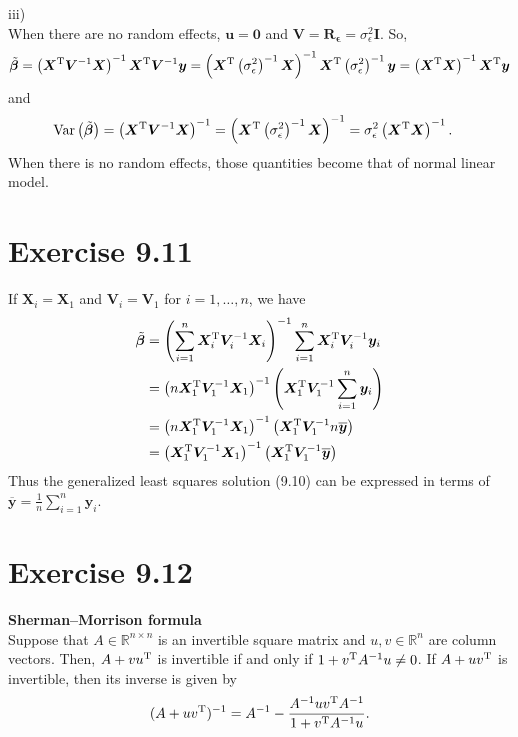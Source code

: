 \documentclass[a4paper]{article}
\newcommand{\Var}{\mathrm{Var}}
\begin{document}
iii)\\
When there are no random effects, $\bm{u} = \bm{0}$ and $\bm{V} = \bm{R}_{\bm{\epsilon}} = \sigma_{\epsilon}^{2}\bm{I}$.
So,
\begin{align*}
\tilde{\bm{\beta}} = \left(\bm{X}^{\rm T}\bm{V}^{-1}\bm{X}\right)^{-1}\bm{X}^{\rm T}\bm{V}^{-1}\bm{y} = \left(\bm{X}^{\rm T}\left(\sigma_{\epsilon}^{2}\right)^{-1}\bm{X}\right)^{-1}\bm{X}^{\rm T}\left(\sigma_{\epsilon}^{2}\right)^{-1}\bm{y} = \left(\bm{X}^{\rm T}\bm{X}\right)^{-1}\bm{X}^{\rm T}\bm{y} 
\end{align*}
and
\begin{align*}
\Var\left(\tilde{\bm{\beta}}\right) &= \left(\bm{X}^{\rm T}\bm{V}^{-1}\bm{X}\right)^{-1} = \left(\bm{X}^{\rm T}\left(\sigma_{\epsilon}^{2}\right)^{-1}\bm{X}\right)^{-1} = \sigma_{\epsilon}^{2}\left(\bm{X}^{\rm T}\bm{X}\right)^{-1}.
\end{align*}
When there is no random effects, those quantities become that of normal linear model.



\vspace{\baselineskip}
\section{Exercise 9.11}
If $\bm{X}_{i}=\bm{X}_{1}$ and $\bm{V}_{i}=\bm{V}_{1}$ for $i=1,\ldots ,n$, we have
\begin{align*}
\tilde{\bm{\beta}} &= \left(\sum_{i=1}^{n}\bm{X}_{i}^{\rm T}\bm{V}_{i}^{-1}\bm{X}_{i}\right)^{-1}\sum_{i=1}^{n}\bm{X}_{i}^{\rm T}\bm{V}_{i}^{-1}\bm{y}_{i}\\
&= \left(n\bm{X}_{1}^{\rm T}\bm{V}_{1}^{-1}\bm{X}_{1}\right)^{-1}\left(\bm{X}_{1}^{\rm T}\bm{V}_{1}^{-1}\sum_{i=1}^{n}\bm{y}_{i}\right)\\
&= \left(n\bm{X}_{1}^{\rm T}\bm{V}_{1}^{-1}\bm{X}_{1}\right)^{-1}\left(\bm{X}_{1}^{\rm T}\bm{V}_{1}^{-1}n\overline{\bm{y}}\right)\\
&= \left(\bm{X}_{1}^{\rm T}\bm{V}_{1}^{-1}\bm{X}_{1}\right)^{-1}\left(\bm{X}_{1}^{\rm T}\bm{V}_{1}^{-1}\overline{\bm{y}}\right)
\end{align*}
Thus the generalized least squares solution (9.10) can be expressed in terms of $\overline{\bm{y}} = \frac{1}{n}\sum_{i=1}^{n}\bm{y}_{i}$.



\vspace{\baselineskip}
\section{Exercise 9.12}
\begin{framed}
\textbf{Sherman--Morrison formula}\\[0.5\baselineskip]
Suppose that $A \in \mathbb{R}^{n\times n}$ is an invertible square matrix and $u, v \in \mathbb{R}^{n}$ are column vectors. Then, $A + vu^{\rm T}$ is invertible if and only if $1+v^{\rm T}A^{-1}u \neq 0$. If $A+uv^{\rm T}$ is invertible, then its inverse is given by
\begin{align*}
(A+uv^{\rm T})^{-1} = A^{-1} - {A^{-1}uv^{\rm T} A^{-1} \over 1 + v^{\rm T} A^{-1}u}.
\end{align*}
\end{framed}
\end{document}
